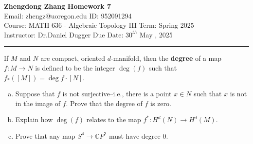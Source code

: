 \documentclass[letterpaper, 12pt]{article}
\begin{document}
\noindent
\large\textbf{Zhengdong Zhang} \hfill \textbf{Homework 7}  \\
Email: zhengz@uoregon.edu \hfill ID: 952091294  \\
\normalsize Course: MATH 636 - Algebraic Topology III \hfill Term: Spring 2025 \\
Instructor: Dr.Daniel Dugger \hfill Due Date: $30^{th}$ May , 2025  \\
\noindent\rule{7in}{2.8pt}
\begin{problem}{1}
If \(M\) and \(N\) are compact, oriented \(d\)-manifold, then the \textbf{degree} of a map \(f:M\rightarrow N\) is defined to be the integer \(\deg(f)\) such that \(f_*([M])=\deg f\cdot [N]\).
\begin{enumerate}[(a)]
\item Suppose that \(f\) is not surjective--i.e., there is a point \(x\in N\) such that \(x\) is not in the image of \(f\). Prove that the degree of \(f\) is zero. 
\item Explain how \(\deg(f)\) relates to the map \(f^*:H^d(N)\rightarrow H^d(M)\). 
\item Prove that any map \(S^4\rightarrow \mathbb{C}P^2\) must have degree 0.
\end{enumerate}
\end{problem}
\end{document}
